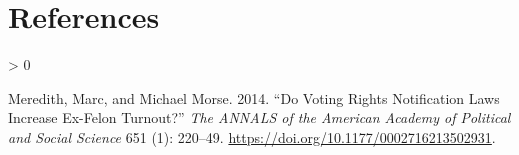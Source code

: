 \documentclass[
  12pt,
]{article}
\newlength{\cslhangindent}
\newenvironment{CSLReferences}[2] %
 {%
  \setlength{\parindent}{0pt}
  \ifodd #1 \everypar{\setlength{\hangindent}{\cslhangindent}}\ignorespaces\fi
  \ifnum #2 > 0
  \setlength{\parskip}{#2\baselineskip}
  \fi
 }%
 {}
\begin{document}
\newpage

\hypertarget{references}{%
\section*{References}\label{references}}

\hypertarget{refs}{}
\begin{CSLReferences}{1}{0}
\leavevmode\hypertarget{ref-Meredith2014}{}%
Meredith, Marc, and Michael Morse. 2014. {``Do {Voting Rights Notification Laws Increase Ex-Felon Turnout}?''} \emph{The ANNALS of the American Academy of Political and Social Science} 651 (1): 220--49. \url{https://doi.org/10.1177/0002716213502931}.

\end{CSLReferences}
\end{document}
